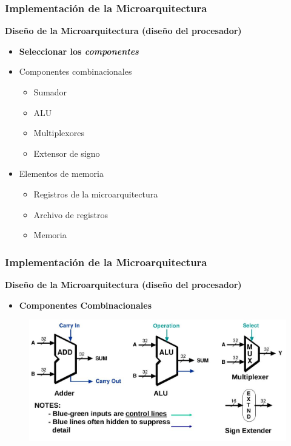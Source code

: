 \documentclass[aspectratio=169,compress]{beamer}
\begin{document}
\begin{footnotesize}
\begin{frame}
\frametitle{Implementación de la Microarquitectura}
\begin{center}\textbf{Diseño de la Microarquitectura (diseño del procesador)}\end{center}
\begin{itemize}
\item \textbf{Seleccionar los \textit{componentes}}
\end{itemize}
\begin{itemize}
\item Componentes combinacionales
\begin{itemize}
\item Sumador
\item ALU
\item Multiplexores
\item Extensor de signo
\end{itemize}

\item Elementos de memoria
\begin{itemize}
\item Registros de la microarquitectura
\item Archivo de registros 
\item Memoria
\end{itemize}
\end{itemize}

\end{frame}





\begin{frame}
\frametitle{Implementación de la Microarquitectura}
\begin{center}\textbf{Diseño de la Microarquitectura (diseño del procesador)}\end{center}
\begin{itemize}
\item \textbf{Componentes Combinacionales}
\end{itemize}

\begin{figure}
\includegraphics[scale=0.3]{images/elementos-combinacionales.jpg} 
\end{figure}


\end{frame}
\end{footnotesize}
\end{document}
